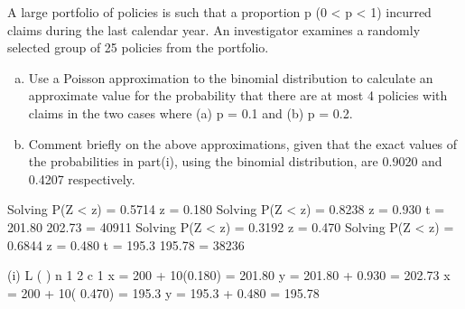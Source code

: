 \documentclass[a4paper,12pt]{article}
\begin{document}
A large portfolio of policies is such that a proportion p (0 < p < 1) incurred claims
during the last calendar year. An investigator examines a randomly selected group of
25 policies from the portfolio.

\begin{enumerate}[(a)]
\item Use a Poisson approximation to the binomial distribution to calculate an approximate value for the probability that there are at most 4 policies with
claims in the two cases where (a) p = 0.1 and (b) p = 0.2.
\item Comment briefly on the above approximations, given that the exact values of
the probabilities in part(i), using the binomial distribution, are 0.9020 and
0.4207 respectively.
\end{enumerate}


Solving P(Z < z) = 0.5714 z = 0.180
Solving P(Z < z) = 0.8238 z = 0.930
t = 201.80 202.73 = 40911
Solving P(Z < z) = 0.3192 z = 0.470
Solving P(Z < z) = 0.6844 z = 0.480
t = 195.3 195.78 = 38236
\item (i)
L ( )
n
1
2
c
1
x = 200 + 10(0.180) = 201.80
y = 201.80 + 0.930 = 202.73
x = 200 + 10( 0.470) = 195.3
y = 195.3 + 0.480 = 195.78

\end{document}
